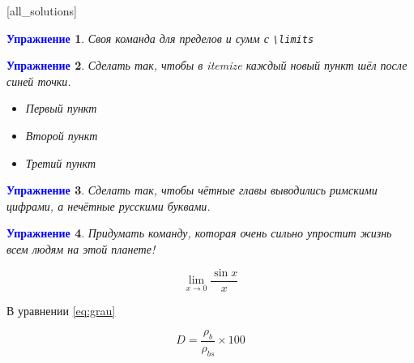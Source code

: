 \documentclass[pdftex, 12pt, a4paper]{article}
\newtheorem{problem}{\textcolor{blue}{Упражнение}}
\begin{document}

[all_solutions]

\begin{problem}
Своя команда для пределов и сумм с \verb|\limits|
\begin{sol}
\end{sol}
\end{problem}

\begin{problem}
Сделать так, чтобы в itemize каждый новый пункт шёл после синей точки.

\newcommand*{\MyPoint}{\tikz \draw [baseline, fill=blue,draw=blue] circle (2.5pt);}
\renewcommand{\labelitemi}{\MyPoint}

\begin{itemize}
\item Первый пункт
\item Второй пункт
\item Третий пункт
\end{itemize}
\end{problem}



\begin{problem}
Сделать так, чтобы чётные главы выводились римскими цифрами, а нечётные русскими буквами.
\begin{sol}
\end{sol}
\end{problem}

\begin{problem}
Придумать команду, которая очень сильно упростит жизнь всем людям на этой планете!
\begin{sol}
\end{sol}
\end{problem}


\newpage

\[ \lim_{x \to 0} \frac{\sin{x}}{x} \]


\renewcommand{\theequation}{Eq. (\arabic{equation})}


В уравнении \ref{eq:grau}

\begin{equation} 
{D=\frac{\rho_{b}}{\rho_{bs}}\times100} 
\label{eq:grau}
\end{equation}
\end{document}
